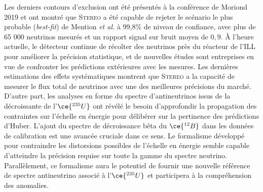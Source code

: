 Les derniers contours d'exclusion ont été présentés à la conférence de Moriond 2019 \cite{docdb849} et ont montré que \textsc{Stereo} a été capable de rejeter le scénario le plus probable (\textit{best-fit}) de Mention \textit{et al.} à 99,8\% de niveau de confiance, avec plus de 65 000 neutrinos mesurés et un rapport signal sur bruit moyen de $0,9$. À l'heure actuelle, le détecteur continue de récolter des neutrinos près du réacteur de l'ILL pour améliorer la précision statistique, et de nouvelles études sont entreprises en vue de confronter les prédictions extérieures avec les mesures. Les dernières estimations des effets systématiques montrent que \textsc{Stereo} a la capacité de mesurer le flux total de neutrinos avec une des meilleures précisions du marché. D'autre part, les analyses en forme du spectre d'antineutrinos issus de la décroissante de l'$\ce{^{235}U}$ ont révélé le besoin d'approfondir la propagation des contraintes sur l'échelle en énergie pour délibérer sur la pertinence des prédictions d'Huber. L'ajout du spectre de décroissance bêta du $\ce{^{12}B}$ dans les données de calibration est une avancée cruciale dans ce sens. Le formalisme développé pour contraindre les distorsions possibles de l'échelle en énergie semble capable d'atteindre la précision requise sur toute la gamme du spectre neutrino. Parallèlement, ce formalisme aura le potentiel de fournir une nouvelle référence de spectre antineutrino associé à l'$\ce{^{235}U}$ et participera à la compréhension des anomalies.\\
